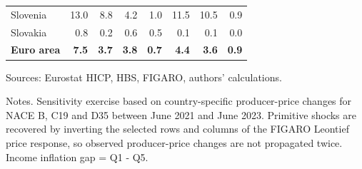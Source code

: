 \begin{table}[H]
\begin{tabular}{lrrrrrrr}
 \\
Slovenia & 13.0 & 8.8 & 4.2 & 1.0 & 11.5 & 10.5 & 0.9
 \\
Slovakia & 0.8 & 0.2 & 0.6 & 0.5 & 0.1 & 0.1 & 0.0
 \\
\midrule
\textbf{Euro area} & \textbf{7.5} & \textbf{3.7} & \textbf{3.8} & \textbf{0.7} & \textbf{4.4} & \textbf{3.6} & \textbf{0.9}
 \\
\bottomrule
\end{tabular}
\par\vspace{0.35em}\footnotesize\noindent Sources: Eurostat HICP, HBS, FIGARO, authors' calculations.
\par\vspace{0.25em}\footnotesize\noindent Notes. Sensitivity exercise based on country-specific producer-price changes for NACE B, C19 and D35 between June 2021 and June 2023. Primitive shocks are recovered by inverting the selected rows and columns of the FIGARO Leontief price response, so observed producer-price changes are not propagated twice. Income inflation gap = Q1 - Q5.
\end{table}
\vspace{0.6em}
